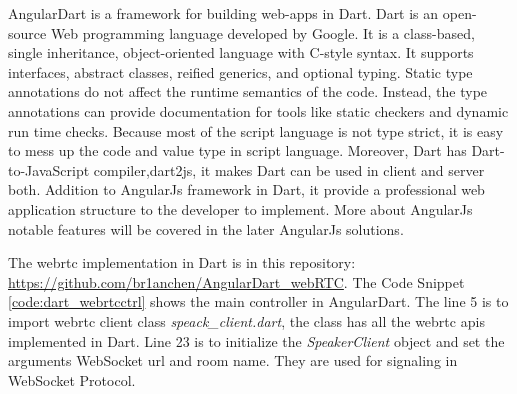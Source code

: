 \par AngularDart is a framework for building web-apps in Dart. Dart is an open-source Web programming language developed by Google. It is a class-based, single inheritance, object-oriented language with C-style syntax. It supports interfaces, abstract classes, reified generics, and optional typing. Static type annotations do not affect the runtime semantics of the code. Instead, the type annotations can provide documentation for tools like static checkers and dynamic run time checks.\cite{wiki:dart} Because most of the script language is not type strict, it is easy to mess up the code and value type in script language. Moreover, Dart has Dart-to-JavaScript compiler,dart2js, it makes Dart can be used in client and server both. Addition to AngularJs framework in Dart, it provide a professional web application structure to the developer to implement. More about AngularJs notable features will be covered in the later AngularJs solutions. 

\par The \gls{webrtc} implementation in Dart is in this repository: \url{https://github.com/br1anchen/AngularDart_webRTC}. The Code Snippet \ref{code:dart_webrtcctrl} shows the main controller in AngularDart. The line 5 is to import \gls{webrtc} client class \textit{speack\_client.dart}, the class has all the \gls{webrtc} \gls{api}s implemented in Dart. Line 23 is to initialize the \textit{SpeakerClient} object and set the arguments WebSocket url and room name. They are used for signaling in WebSocket Protocol.

